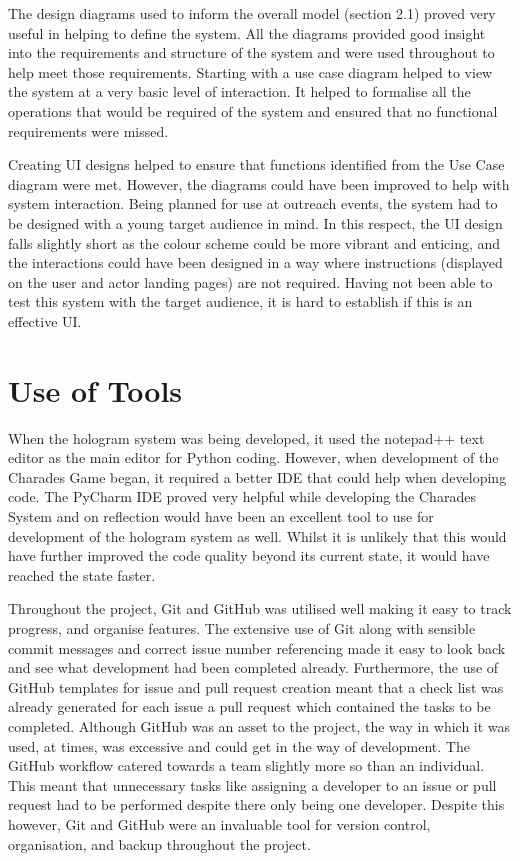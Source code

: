 The design diagrams used to inform the overall model (section 2.1) proved very useful in helping to define the system. All the diagrams provided good insight into the requirements and structure of the system and were used throughout to help meet those requirements. Starting with a use case diagram helped to view the system at a very basic level of interaction. It helped to formalise all the operations that would be required of the system and ensured that no functional requirements were missed.

Creating UI designs helped to ensure that functions identified from the Use Case diagram were met. However, the diagrams could have been improved to help with system interaction. Being planned for use at outreach events, the system had to be designed with a young target audience in mind. In this respect, the UI design falls slightly short as the colour scheme could be more vibrant and enticing, and the interactions could have been designed in a way where instructions (displayed on the user and actor landing pages) are not required. Having not been able to test this system with the target audience, it is hard to establish if this is an effective UI.

\section{Use of Tools}
When the hologram system was being developed, it used the notepad++ text editor as the main editor for Python coding. However, when development of the Charades Game began, it required a better IDE that could help when developing code. The PyCharm IDE proved very helpful while developing the Charades System and on reflection would have been an excellent tool to use for development of the hologram system as well. Whilst it is unlikely that this would have further improved the code quality beyond its current state, it would have reached the state faster.

Throughout the project, Git and GitHub was utilised well making it easy to track progress, and organise features. The extensive use of Git along with sensible commit messages and correct issue number referencing made it easy to look back and see what development had been completed already. Furthermore, the use of GitHub templates for issue and pull request creation meant that a check list was already generated for each issue a pull request which contained the tasks to be completed. Although GitHub was an asset to the project, the way in which it was used, at times, was excessive and could get in the way of development. The GitHub workflow catered towards a team slightly more so than an individual. This meant that unnecessary tasks like assigning a developer to an issue or pull request had to be performed despite there only being one developer. Despite this however, Git and GitHub were an invaluable tool for version control, organisation, and backup throughout the project. 

